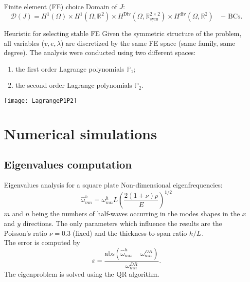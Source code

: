 \documentclass{beamer}
\begin{document}
\begin{frame}{Finite element (FE) choice}
Domain of $J$:
\begin{equation*}
\label{eq:domJ}
\mathcal{D}(J) = H^{1}(\Omega) \times H^{1}(\Omega, \mathbb{R}^2) \times H^{\text{Div}}(\Omega, \mathbb{R}^{2 \times 2}_{\text{sym}}) \times H^{\text{div}}(\Omega, \mathbb{R}^2) \quad \text{+ BCs}.
\end{equation*}

\begin{block}{Heuristic for selecting stable FE}
Given the symmetric structure of the problem, all variables ($v, e, \lambda$) are discretized by the same FE space (same family, same degree). The analysis were conducted using two different spaces:
	\begin{enumerate}
	\item the first order Lagrange polynomials $\mathbb{P}_1$;
	\item the second order Lagrange polynomials $\mathbb{P}_2$.
\end{enumerate}
\center
\texttt{[image: LagrangeP1P2]}
\end{block}

\end{frame}

\section{Numerical simulations}


\subsection{Eigenvalues computation}

\begin{frame}{Eigenvalues analysis for a square plate}
Non-dimensional eigenfrequencies:
\begin{equation}
\widehat{\omega}_{mn}^h = \omega_{mn}^h L \left(\frac{2 (1 + \nu) \rho}{E}\right)^{1/2}
\end{equation}
$m$ and $n$ being the numbers of half-waves occurring in the modes shapes in the $x$ and $y$ directions. The only parameters which influence the results are the Poisson's ratio $\nu=0.3$ (fixed) and the thickness-to-span ratio $h/L$. \\
The error is computed by
\begin{equation}
\varepsilon = \frac{\text{abs}(\widehat{\omega}_{mn}^h - \omega_{mn}^{DR})}{\omega_{mn}^{DR}}.
\end{equation}
The eigenproblem is solved using the QR algorithm.

\end{frame}
\end{document}
